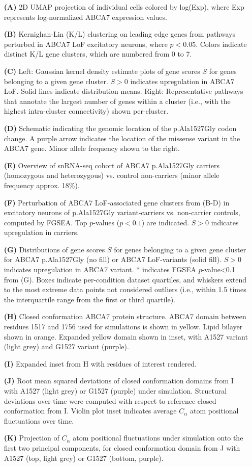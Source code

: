 \begin{itemize}
    \item[\textbf{(A)}] 2D UMAP projection of individual cells colored by log(Exp), where Exp represents log-normalized ABCA7 expression values.
    \item[\textbf{(B)}] Kernighan-Lin (K/L) clustering on leading edge genes from pathways perturbed in ABCA7 LoF excitatory neurons, where $p<0.05$. Colors indicate distinct K/L gene clusters, which are numbered from 0 to 7.
    \item[\textbf{(C)}] Left: Gaussian kernel density estimate plots of gene scores $S$ for genes belonging to a given gene cluster. $S>0$ indicates upregulation in ABCA7 LoF. Solid lines indicate distribution means. Right: Representative pathways that annotate the largest number of genes within a cluster (i.e., with the highest intra-cluster connectivity) shown per-cluster. 
    \item[\textbf{(D)}] Schematic indicating the genomic location of the p.Ala1527Gly codon change. A purple arrow indicates the location of the missense variant in the ABCA7 gene. Minor allele frequency shown to the right. 
    \item[\textbf{(E)}] Overview of snRNA-seq cohort of ABCA7 p.Ala1527Gly carriers (homozygous and heterozygous) vs. control non-carriers (minor allele frequency approx. 18\%).
    \item[\textbf{(F)}] Perturbation of ABCA7 LoF-associated gene clusters from (B-D) in excitatory neurons of p.Ala1527Gly variant-carriers vs. non-carrier controls, computed by FGSEA. Top $p$-values ($p<0.1$) are indicated. $S>0$ indicates upregulation in carriers.
    \item[\textbf{(G)}] Distributions of gene scores $S$ for genes belonging to a given gene cluster for ABCA7 p.Ala1527Gly (no fill) or ABCA7 LoF-variants (solid fill). $S>0$ indicates upregulation in ABCA7 variant. * indicates FGSEA $p$-value<0.1 from (G). Boxes indicate per-condition dataset quartiles, and whiskers extend to the most extreme data points not considered outliers (i.e., within 1.5 times the interquartile range from the first or third quartile).
    \item[\textbf{(H)}] Closed conformation ABCA7 protein structure. ABCA7 domain between residues 1517 and 1756 used for simulations is shown in yellow. Lipid bilayer shown in orange. Expanded yellow domain shown in inset, with A1527 variant (light grey) and G1527 variant (purple).
    \item[\textbf{(I)}] Expanded inset from H with residues of interest rendered.
    \item[\textbf{(J)}] Root mean squared deviations of closed conformation domains from I with A1527 (light grey) or G1527 (purple) under simulation. Structural deviations over time were computed with respect to reference closed conformation from I. Violin plot inset indicates average $C_\alpha$ atom positional fluctuations over time.
    \item[\textbf{(K)}] Projection of $C_\alpha$ atom positional fluctuations under simulation onto the first two principal components, for closed conformation domain from J with A1527 (top, light grey) or G1527 (bottom, purple). 
\end{itemize}